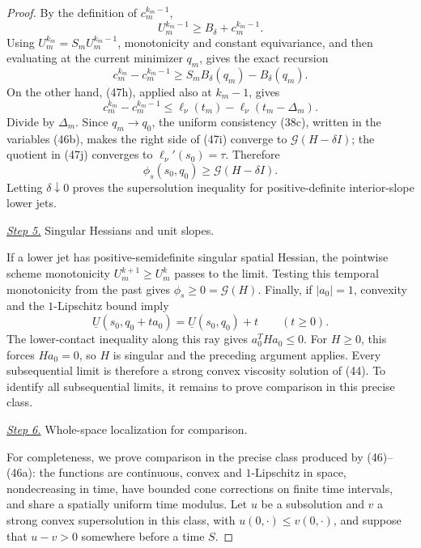 \documentclass{aomart}
\theoremstyle{definition}
\newcommand{\1}{\mathbf 1}
\begin{document}
\begin{proof}
By the definition of $c_ m^{k_ m-1}$,
\begin{equation*}
U_ m^{k_ m-1}\geq B_ \delta+c_ m^{k_ m-1}.
\end{equation*}
Using $U_ m^{k_ m}=S_ mU_ m^{k_ m-1}$, monotonicity and constant
equivariance, and then evaluating at the current minimizer $q_ m$,
gives the exact recursion
\begin{equation}
c_ m^{k_ m}-c_ m^{k_ m-1}
\geq S_ mB_ \delta(q_ m)-B_ \delta(q_ m).
\tag{47i}
\end{equation}
On the other hand, (47h), applied also at $k_ m-1$, gives
\begin{equation}
c_ m^{k_ m}-c_ m^{k_ m-1}
\leq\ell_ \nu(t_ m)-\ell_ \nu(t_ m-\Delta_ m).
\tag{47j}
\end{equation}
Divide by $\Delta_ m$.  Since $q_ m\to q_ 0$, the uniform consistency
(38c), written in the variables (46b), makes the right side of (47i)
converge to $\mathcal G(H-\delta I)$; the quotient in (47j) converges to
$\ell_ \nu'(s_ 0)=\tau$.  Therefore
\begin{equation*}
\phi_ s(s_ 0,q_ 0)\geq \mathcal G(H-\delta I).
\end{equation*}
Letting $\delta\downarrow0$ proves the supersolution inequality for
positive-definite interior-slope lower jets.

\smallskip\noindent
\underline{\textit{Step 5.}} Singular Hessians and unit slopes.

If a lower jet has positive-semidefinite singular spatial Hessian, the
pointwise scheme monotonicity $U_ m^{k+1}\geq U_ m^k$ passes to the
limit.  Testing this temporal monotonicity from the past gives
$\phi_ s\geq0=\mathcal G(H)$.  Finally, if $|a_ 0|=1$, convexity and the
$1$-Lipschitz bound imply
\begin{equation*}
\underline U(s_ 0,q_ 0+ta_ 0)=\underline U(s_ 0,q_ 0)+t
\qquad(t\geq0).
\end{equation*}
The lower-contact inequality along this ray gives
$a_ 0^THa_ 0\leq0$.  For $H\geq0$, this forces $Ha_ 0=0$, so $H$
is singular and the preceding argument applies.  Every subsequential
limit is therefore a strong convex viscosity solution of (44).  To
identify all subsequential limits, it remains to prove comparison in
this precise class.

\smallskip\noindent
\underline{\textit{Step 6.}} Whole-space localization for comparison.

For completeness, we prove comparison in the precise class produced by
(46)--(46a): the functions are continuous, convex and $1$-Lipschitz
in space, nondecreasing in time, have bounded cone corrections on
finite time intervals, and share a spatially uniform time modulus.
Let $u$ be a subsolution and $v$ a strong convex supersolution in
this class, with $u(0,\cdot)\leq v(0,\cdot)$, and suppose that
$u-v>0$ somewhere before a time $S$.


\end{proof}
\end{document}
